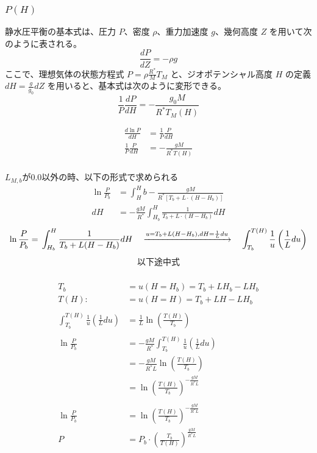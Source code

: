 \documentclass[a4paper,12pt]{article}
\begin{document}
\subsubsection{$P(H)$}

静水圧平衡の基本式は、圧力 $P$、密度 $\rho$、重力加速度 $g$、幾何高度 $Z$ を用いて次のように表される。
\[
\frac{dP}{dZ} = - \rho g
\]
ここで、理想気体の状態方程式 $P = \rho \frac{R^*}{M} T_M$ と、ジオポテンシャル高度 $H$ の定義 $dH = \frac{g}{g_0} dZ$ を用いると、基本式は次のように変形できる。
\[
\frac{1}{P}\frac{dP}{dH} = -\frac{g_0 M}{R^*T_M(H)}
\]

\begin{align*}
\frac{d\ln P}{dH} &= \frac{1}{P}\frac{P}{dH}\\
\frac{1}{P}\frac{P}{dH} &= -\frac{gM}{R^*T(H)}\\
\end{align*}

$L_{M, b}$が0.0以外の時、以下の形式で求められる\\

\begin{align*}
\ln \frac{P}{P_b}&=\int^H_Hb- \frac{gM}{R^*\left[T_b+L \cdot \left(H-H_b \right) \right]}\\
dH&=- \frac{gM}{R^*} \int^H_{H_b}\frac{1}{T_b+L \cdot \left(H - H_b \right)}dH
\end{align*}
\[
\ln \frac{P}{P_b}=\\
\int_{H_b}^{H} \frac{1}{T_b + L(H - H_b)} dH \quad \xrightarrow{u=T_b+L(H-H_b), dH=\frac{1}{L}du} \quad \int_{T_b}^{T(H)} \frac{1}{u} \left(\frac{1}{L} du\right)
\]
\begin{align*}
\text{以下途中式}\\
\end{align*}

\begin{align*}
T_b&=u(H=H_b)=T_b+LH_b-LH_b\\
T(H):&=u(H=H)=T_b+LH-LH_b\\\\
\int^{T(H)}_{T_b} \frac{1}{u} \left( \frac{1}{L} du \right) &=\frac{1}{L} \ln \left( \frac{T(H)}{T_b} \right)\\\\
\ln \frac{P}{P_b}
&=- \frac{gM}{R^*} \int^{T(H)}_{T_b} \frac{1}{u} \left( \frac{1}{L} du \right)\\
&=- \frac{gM}{R^*L} \ln \left( \frac{T(H)}{T_b} \right)\\
&=\ln \left( \frac{T(H)}{T_b} \right) ^ {- \frac{gM}{R^*L}}\\\\
\ln \frac{P}{P_b}&=\ln \left( \frac{T(H)}{T_b} \right) ^ {- \frac{gM}{R^*L}}\\
P &= P_b \cdot \left( \frac{T_b}{T(H)} \right) ^ {\frac{gM}{R^*L}}\\
\end{align*}
\end{document}
